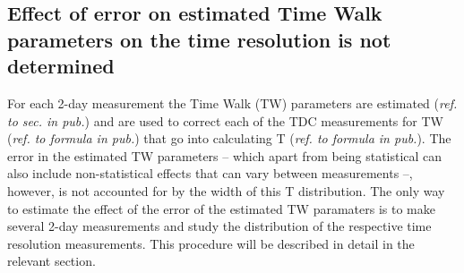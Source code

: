 \documentclass[12pt]{article}
\begin{document}
\subsection{Effect of error on estimated Time Walk parameters on the time resolution is not determined}
For each 2-day measurement the Time Walk (TW) parameters are estimated (\textit{ref. to sec. in pub.}) and are used to correct each of the TDC measurements for TW (\textit{ref. to formula in pub.}) that go into calculating T (\textit{ref. to formula in pub.}). The error in the estimated TW parameters -- which apart from being statistical can also include non-statistical effects that can vary between measurements --, however, is not accounted for by the width of this T distribution. The only way to estimate the effect of the error of the estimated TW paramaters is to make several 2-day measurements and study the distribution of the respective time resolution measurements. This procedure will be described in detail in the relevant section.
\end{document}
